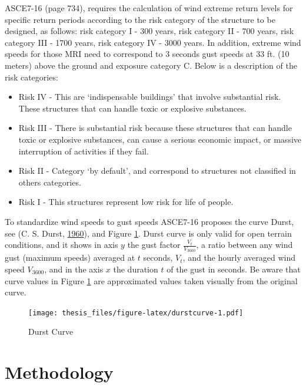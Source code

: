 \documentclass[12pt,twoside]{reedthesis}
\providecommand{\tightlist}{%
  \setlength{\itemsep}{0pt}\setlength{\parskip}{0pt}}
\begin{document}
ASCE7-16 (page 734), requires the calculation of wind extreme return levels for specific return periods according to the risk category of the structure to be designed, as follows: risk category I - 300 years, risk category II - 700 years, risk category III - 1700 years, risk category IV - 3000 years. In addition, extreme wind speeds for those MRI need to correspond to 3 seconds gust speeds at 33 ft. (10 meters) above the ground and exposure category C. Below is a description of the risk categories:
\begin{itemize}
\tightlist
\item
  Risk IV - This are `indispensable buildings' that involve substantial risk. These structures that can handle toxic or explosive substances.
\item
  Risk III - There is substantial risk because these structures that can handle toxic or explosive substances, can cause a serious economic impact, or massive interruption of activities if they fail.
\item
  Risk II - Category `by default', and correspond to structures not classified in others categories.
\item
  Risk I - This structures represent low risk for life of people.
\end{itemize}
To standardize wind speeds to gust speeds ASCE7-16 proposes the curve Durst, see (C. S. Durst, \protect\hyperlink{ref-Durst1960}{1960}), and Figure \ref{fig:durstcurve}. Durst curve is only valid for open terrain conditions, and it shows in axis \(y\) the gust factor \(\frac{V_t}{V_{3600}}\), a ratio between any wind gust (maximum speeds) averaged at \(t\) seconds, \(V_t\), and the hourly averaged wind speed \(V_{3600}\), and in the axis \(x\) the duration \(t\) of the gust in seconds. Be aware that curve values in Figure \ref{fig:durstcurve} are approximated values taken visually from the original curve.
\begin{figure}
\centering
\texttt{[image: thesis\_files/figure-latex/durstcurve-1.pdf]}
\caption{\label{fig:durstcurve}Durst Curve}
\end{figure}
\hypertarget{rmd-method}{%
\chapter{Methodology}\label{rmd-method}}
\end{document}
